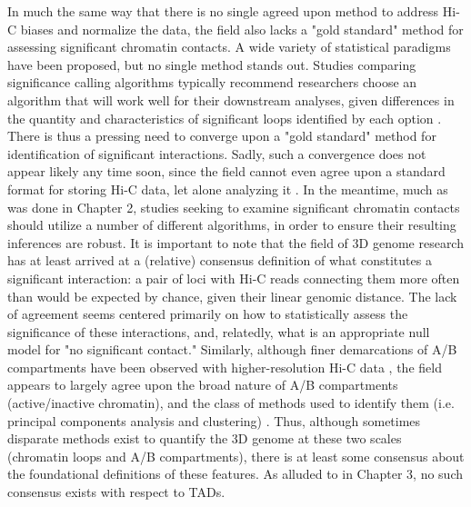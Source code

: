 In much the same way that there is no single agreed upon method to address Hi-C biases and normalize the data, the field also lacks a "gold standard" method for assessing significant chromatin contacts. A wide variety of statistical paradigms have been proposed, but no single method stands out. Studies comparing significance calling algorithms typically recommend researchers choose an algorithm that will work well for their downstream analyses, given differences in the quantity and characteristics of significant loops identified by each option \cite{Forcato.2017, Ay.2015, Lyu.2020}. There is thus a pressing need to converge upon a "gold standard" method for identification of significant interactions. Sadly, such a convergence does not appear likely any time soon, since the field cannot even agree upon a standard format for storing Hi-C data, let alone analyzing it \cite{Pal.2019, Marti-Renom.2018}. In the meantime, much as was done in Chapter 2, studies seeking to examine significant chromatin contacts should utilize a number of different algorithms, in order to ensure their resulting inferences are robust. It is important to note that the field of 3D genome research has at least arrived at a (relative) consensus definition of what constitutes a significant interaction: a pair of loci with Hi-C reads connecting them more often than would be expected by chance, given their linear genomic distance. The lack of agreement seems centered primarily on how to statistically assess the significance of these interactions, and, relatedly, what is an appropriate null model for "no significant contact." Similarly, although finer demarcations of A/B compartments have been observed with higher-resolution Hi-C data \cite{Rao.2014}, the field appears to largely agree upon the broad nature of A/B compartments (active/inactive chromatin), and the class of methods used to identify them (i.e. principal components analysis and clustering) \cite{Miura.2018}. Thus, although sometimes disparate methods exist to quantify the 3D genome at these two scales (chromatin loops and A/B compartments), there is at least some consensus about the foundational definitions of these features. As alluded to in Chapter 3, no such consensus exists with respect to TADs.

